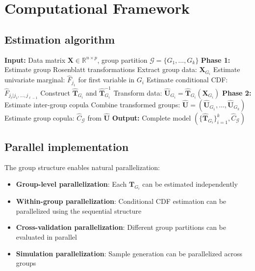 \section{Computational Framework}
\subsection{Estimation algorithm}
\begin{algorithm}[H]
\caption{Group Copula Estimation via Rosenblatt Decomposition}
\begin{algorithmic}[1]
\State \textbf{Input:} Data matrix $\mathbf{X} \in \mathbb{R}^{n \times p}$, group partition $\mathcal{G} = \{G_1, \ldots, G_k\}$
\State \textbf{Phase 1:} Estimate group Rosenblatt transformations
    \State Extract group data: $\mathbf{X}_{G_i}$
    \State Estimate univariate marginal: $\hat{F}_{j_1}$ for first variable in $G_i$
        \State Estimate conditional CDF: $\hat{F}_{j_\ell|j_1,\ldots,j_{\ell-1}}$
    \EndFor
    \State Construct $\hat{\mathbf{T}}_{G_i}$ and $\hat{\mathbf{T}}_{G_i}^{-1}$
    \State Transform data: $\hat{\mathbf{U}}_{G_i} = \hat{\mathbf{T}}_{G_i}(\mathbf{X}_{G_i})$
\EndFor
\State \textbf{Phase 2:} Estimate inter-group copula
\State Combine transformed groups: $\hat{\mathbf{U}} = (\hat{\mathbf{U}}_{G_1}, \ldots, \hat{\mathbf{U}}_{G_k})$
\State Estimate group copula: $\hat{C}_{\mathcal{G}}$ from $\hat{\mathbf{U}}$
\State \textbf{Output:} Complete model $(\{\hat{\mathbf{T}}_{G_i}\}_{i=1}^k, \hat{C}_{\mathcal{G}})$
\end{algorithmic}
\end{algorithm}

\subsection{Parallel implementation}
The group structure enables natural parallelization:
\begin{itemize}
    \item \textbf{Group-level parallelization}: Each $\mathbf{T}_{G_i}$ can be estimated independently
    \item \textbf{Within-group parallelization}: Conditional CDF estimation can be parallelized using the sequential structure
    \item \textbf{Cross-validation parallelization}: Different group partitions can be evaluated in parallel
    \item \textbf{Simulation parallelization}: Sample generation can be parallelized across groups
\end{itemize}

